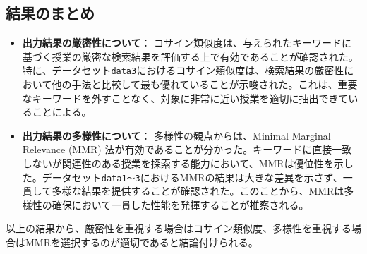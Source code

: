 \subsection{結果のまとめ}

\begin{itemize}
  \item \textbf{出力結果の厳密性について}：  
    コサイン類似度は、与えられたキーワードに基づく授業の厳密な検索結果を評価する上で有効であることが確認された。特に、データセット\texttt{data3}におけるコサイン類似度は、検索結果の厳密性において他の手法と比較して最も優れていることが示唆された。これは、重要なキーワードを外すことなく、対象に非常に近い授業を適切に抽出できていることによる。

  \item \textbf{出力結果の多様性について}：
    多様性の観点からは、Minimal Marginal Relevance (MMR) 法が有効であることが分かった。キーワードに直接一致しないが関連性のある授業を探索する能力において、MMRは優位性を示した。データセット\texttt{data1〜3}におけるMMRの結果は大きな差異を示さず、一貫して多様な結果を提供することが確認された。このことから、MMRは多様性の確保において一貫した性能を発揮することが推察される。
\end{itemize}

以上の結果から、厳密性を重視する場合はコサイン類似度、多様性を重視する場合はMMRを選択するのが適切であると結論付けられる。

